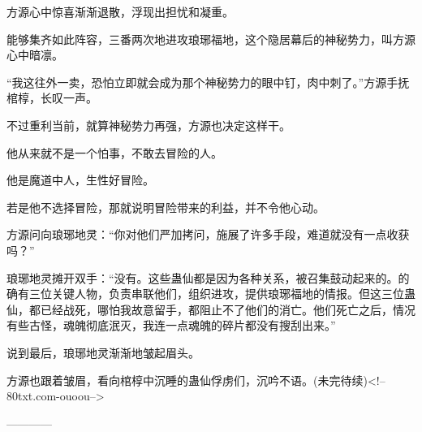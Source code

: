 \begin{this_body}
方源心中惊喜渐渐退散，浮现出担忧和凝重。

能够集齐如此阵容，三番两次地进攻琅琊福地，这个隐居幕后的神秘势力，叫方源心中暗凛。

“我这往外一卖，恐怕立即就会成为那个神秘势力的眼中钉，肉中刺了。”方源手抚棺椁，长叹一声。

不过重利当前，就算神秘势力再强，方源也决定这样干。

他从来就不是一个怕事，不敢去冒险的人。

他是魔道中人，生性好冒险。

若是他不选择冒险，那就说明冒险带来的利益，并不令他心动。

方源问向琅琊地灵：“你对他们严加拷问，施展了许多手段，难道就没有一点收获吗？”

琅琊地灵摊开双手：“没有。这些蛊仙都是因为各种关系，被召集鼓动起来的。的确有三位关键人物，负责串联他们，组织进攻，提供琅琊福地的情报。但这三位蛊仙，都已经战死，哪怕我故意留手，都阻止不了他们的消亡。他们死亡之后，情况有些古怪，魂魄彻底泯灭，我连一点魂魄的碎片都没有搜刮出来。”

说到最后，琅琊地灵渐渐地皱起眉头。

方源也跟着皱眉，看向棺椁中沉睡的蛊仙俘虏们，沉吟不语。(未完待续)<!--80txt.com-ouoou-->

------------

\end{this_body}

